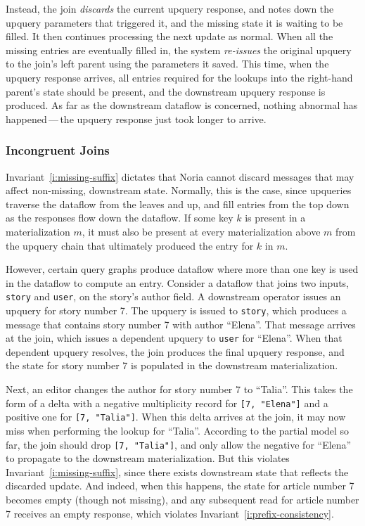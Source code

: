 Instead, the join \emph{discards} the current upquery response, and notes down
the upquery parameters that triggered it, and the missing state it is waiting to
be filled. It then continues processing the next update as normal. When all the
missing entries are eventually filled in, the system \emph{re-issues} the
original upquery to the join's left parent using the parameters it saved. This
time, when the upquery response arrives, all entries required for the lookups
into the right-hand parent's state should be present, and the downstream upquery
response is produced. As far as the downstream dataflow is concerned, nothing
abnormal has happened\,---\,the upquery response just took longer to arrive.

\subsubsection{Incongruent Joins}
\label{join-evictions}

Invariant~\ref{i:missing-suffix} dictates that Noria cannot discard messages
that may affect non-missing, downstream state. Normally, this is the case, since
upqueries traverse the dataflow from the leaves and up, and fill entries from
the top down as the responses flow down the dataflow. If some key $k$ is present
in a materialization $m$, it must also be present at every materialization above
$m$ from the upquery chain that ultimately produced the entry for $k$ in $m$.

However, certain query graphs produce dataflow where more than one key is used
in the dataflow to compute an entry. Consider a dataflow that joins two inputs,
\texttt{story} and \texttt{user}, on the story's author field. A downstream
operator issues an upquery for story number 7. The upquery is issued to
\texttt{story}, which produces a message that contains story number 7 with
author ``Elena''. That message arrives at the join, which issues a dependent
upquery to \texttt{user} for ``Elena''. When that dependent upquery resolves,
the join produces the final upquery response, and the state for story number 7
is populated in the downstream materialization.

Next, an editor changes the author for story number 7 to ``Talia''. This
takes the form of a delta with a negative multiplicity record for \texttt{[7,
"Elena"]} and a positive one for \texttt{[7, "Talia"]}. When this delta arrives
at the join, it may now miss when performing the lookup for ``Talia''. According
to the partial model so far, the join should drop \texttt{[7, "Talia"]}, and
only allow the negative for ``Elena'' to propagate to the downstream
materialization. But this violates Invariant~\ref{i:missing-suffix}, since there
exists downstream state that reflects the discarded update. And indeed, when
this happens, the state for article number 7 becomes empty (though not missing),
and any subsequent read for article number 7 receives an empty response, which
violates Invariant~\ref{i:prefix-consistency}.

